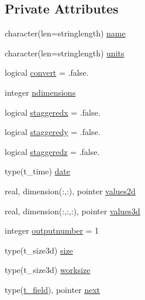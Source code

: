 \subsection*{Private Attributes}
\begin{DoxyCompactItemize}
\item 
character(len=stringlength) \mbox{\hyperlink{structmodulewrfformat_1_1t__field_a547571309afe696f2c47a83042426ba1}{name}}
\item 
character(len=stringlength) \mbox{\hyperlink{structmodulewrfformat_1_1t__field_a1a7d40c906de6c5abcaa0a14f9269db0}{units}}
\item 
logical \mbox{\hyperlink{structmodulewrfformat_1_1t__field_af8fb6bf0a3f67612405b725f3f346056}{convert}} = .false.
\item 
integer \mbox{\hyperlink{structmodulewrfformat_1_1t__field_a12fcef7ab3819bc351ad2c8adc53f34d}{ndimensions}}
\item 
logical \mbox{\hyperlink{structmodulewrfformat_1_1t__field_a42ba68e4c4aa7c076e3462229ec46cfd}{staggeredx}} = .false.
\item 
logical \mbox{\hyperlink{structmodulewrfformat_1_1t__field_a4c6d148dd8876f5738670f933006e90b}{staggeredy}} = .false.
\item 
logical \mbox{\hyperlink{structmodulewrfformat_1_1t__field_a2a05c7114bd51dcd018ac109a76c1dd7}{staggeredz}} = .false.
\item 
type(t\+\_\+time) \mbox{\hyperlink{structmodulewrfformat_1_1t__field_a737fbe00a38a7ecd1725786ddfb07bcb}{date}}
\item 
real, dimension(\+:,\+:), pointer \mbox{\hyperlink{structmodulewrfformat_1_1t__field_ab03a26865884d4a01a14f7b7bd46d26a}{values2d}}
\item 
real, dimension(\+:,\+:,\+:), pointer \mbox{\hyperlink{structmodulewrfformat_1_1t__field_a9a933760c2baa9ec1801c1f78ddb33e1}{values3d}}
\item 
integer \mbox{\hyperlink{structmodulewrfformat_1_1t__field_a19ae18db533efda190b2089aff9fe594}{outputnumber}} = 1
\item 
type(t\+\_\+size3d) \mbox{\hyperlink{structmodulewrfformat_1_1t__field_a0f43b164c775f4336e21770edebdc77c}{size}}
\item 
type(t\+\_\+size3d) \mbox{\hyperlink{structmodulewrfformat_1_1t__field_ac62fde7e2a6fe22fc472e9d521e59b67}{worksize}}
\item 
type(\mbox{\hyperlink{structmodulewrfformat_1_1t__field}{t\+\_\+field}}), pointer \mbox{\hyperlink{structmodulewrfformat_1_1t__field_ac17b6ed61e2fac653544ed2014844849}{next}}
\end{DoxyCompactItemize}


